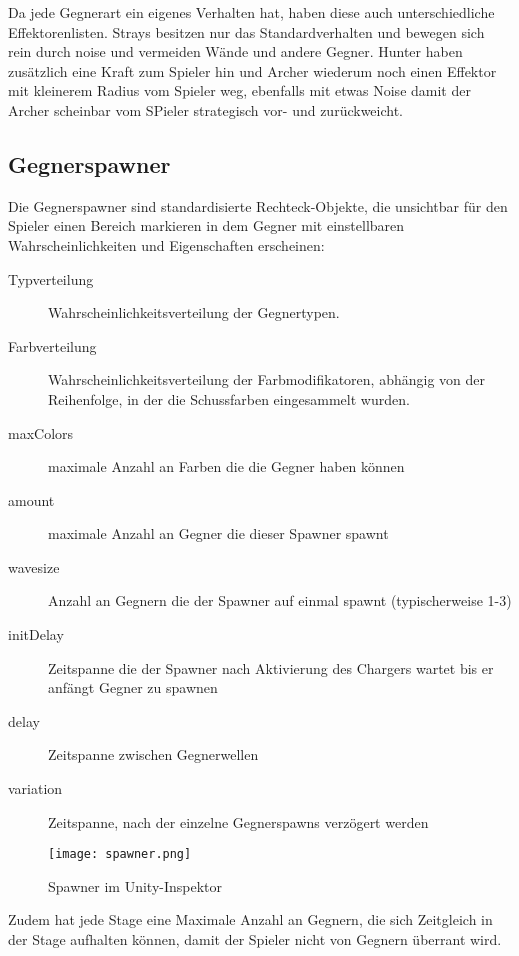 Da jede Gegnerart ein eigenes Verhalten hat, haben diese auch unterschiedliche Effektorenlisten. Strays besitzen nur das Standardverhalten und bewegen sich rein durch noise und vermeiden Wände und andere Gegner. Hunter haben zusätzlich eine Kraft zum Spieler hin und Archer wiederum noch einen Effektor mit kleinerem Radius vom Spieler weg, ebenfalls mit etwas Noise damit der Archer scheinbar vom SPieler strategisch vor- und zurückweicht.



\subsection{Gegnerspawner}
\label{subsect:spawner}

Die Gegnerspawner sind standardisierte Rechteck-Objekte, die unsichtbar für den Spieler einen Bereich markieren in dem Gegner mit einstellbaren Wahrscheinlichkeiten und Eigenschaften erscheinen:

\begin{description}
\item[Typverteilung] Wahrscheinlichkeitsverteilung der Gegnertypen.
\item[Farbverteilung] Wahrscheinlichkeitsverteilung der Farbmodifikatoren, abhängig von der Reihenfolge, in der die Schussfarben eingesammelt wurden.
\item[maxColors] maximale Anzahl an Farben die die Gegner haben können
\item[amount] maximale Anzahl an Gegner die dieser Spawner spawnt
\item[wavesize] Anzahl an Gegnern die der Spawner auf einmal spawnt (typischerweise 1-3)
\item[initDelay] Zeitspanne die der Spawner nach Aktivierung des Chargers wartet bis er anfängt Gegner zu spawnen
\item[delay] Zeitspanne zwischen Gegnerwellen
\item[variation] Zeitspanne, nach der einzelne Gegnerspawns verzögert werden
\end{description}

\begin{figure}[H]
\centering
\texttt{[image: spawner.png]}
\caption{Spawner im Unity-Inspektor}
\label{img:spawner}
\end{figure}

Zudem hat jede Stage eine Maximale Anzahl an Gegnern, die sich Zeitgleich in der Stage aufhalten können, damit der Spieler nicht von Gegnern überrant wird.

